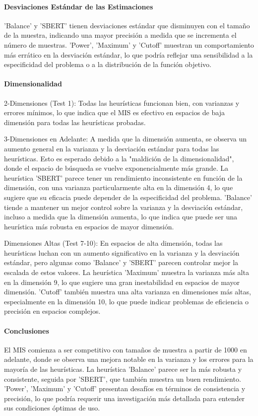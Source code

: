 \documentclass{article}
\begin{document}
\paragraph{Desviaciones Estándar de las Estimaciones}
'Balance' y 'SBERT' tienen desviaciones estándar que disminuyen con el tamaño de la muestra, indicando una mayor precisión a medida que se incrementa el número de muestras.
'Power', 'Maximum' y 'Cutoff' muestran un comportamiento más errático en la desviación estándar, lo que podría reflejar una sensibilidad a la especificidad del problema o a la distribución de la función objetivo.

\paragraph{Dimensionalidad}
2-Dimensiones (Test 1): Todas las heurísticas funcionan bien, con varianzas y errores mínimos, lo que indica que el MIS es efectivo en espacios de baja dimensión para todas las heurísticas probadas.

3-Dimensiones en Adelante: A medida que la dimensión aumenta, se observa un aumento general en la varianza y la desviación estándar para todas las heurísticas. Esto es esperado debido a la "maldición de la dimensionalidad", donde el espacio de búsqueda se vuelve exponencialmente más grande.
La heurística 'SBERT' parece tener un rendimiento inconsistente en función de la dimensión, con una varianza particularmente alta en la dimensión 4, lo que sugiere que su eficacia puede depender de la especificidad del problema.
'Balance' tiende a mantener un mejor control sobre la varianza y la desviación estándar, incluso a medida que la dimensión aumenta, lo que indica que puede ser una heurística más robusta en espacios de mayor dimensión.

Dimensiones Altas (Test 7-10): En espacios de alta dimensión, todas las heurísticas luchan con un aumento significativo en la varianza y la desviación estándar, pero algunas como 'Balance' y 'SBERT' parecen controlar mejor la escalada de estos valores.
La heurística 'Maximum' muestra la varianza más alta en la dimensión 9, lo que sugiere una gran inestabilidad en espacios de mayor dimensión.
'Cutoff' también muestra una alta varianza en dimensiones más altas, especialmente en la dimensión 10, lo que puede indicar problemas de eficiencia o precisión en espacios complejos.

\paragraph{Conclusiones}
El MIS comienza a ser competitivo con tamaños de muestra a partir de 1000 en adelante, donde se observa una mejora notable en la varianza y los errores para la mayoría de las heurísticas. La heurística 'Balance' parece ser la más robusta y consistente, seguida por 'SBERT', que también muestra un buen rendimiento. 'Power', 'Maximum' y 'Cutoff' presentan desafíos en términos de consistencia y precisión, lo que podría requerir una investigación más detallada para entender sus condiciones óptimas de uso.
\end{document}
